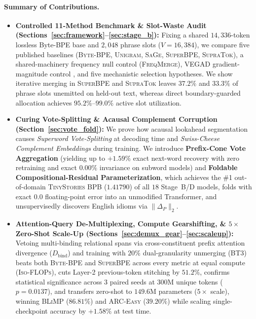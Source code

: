 \documentclass[11pt,a4paper]{article}
\begin{document}
\paragraph{Summary of Contributions.}
\begin{itemize}
    \item \textbf{Controlled 11-Method Benchmark \& Slot-Waste Audit (Sections~\ref{sec:framework}--\ref{sec:stage_b}):} Fixing a shared $14{,}336$-token lossless Byte-BPE base and $2{,}048$ phrase slots ($V=16{,}384$), we compare five published baselines (\textsc{Byte-BPE}, \textsc{Unigram}, \textsc{SaGe}, \textsc{SuperBPE}, \textsc{SupraTok}), a shared-machinery frequency null control (\textsc{FreqMerge}), \textsc{VEGAD} gradient-magnitude control \citep{liu2024gold}, and five mechanistic selection hypotheses. We show iterative merging in \textsc{SuperBPE} and \textsc{SupraTok} leaves $37.2\%$ and $33.3\%$ of phrase slots unemitted on held-out text, whereas direct boundary-guarded allocation achieves $95.2\%$--$99.0\%$ active slot utilization.
    \item \textbf{Curing Vote-Splitting \& Acausal Complement Corruption (Section~\ref{sec:vote_fold}):} We prove how acausal lookahead segmentation causes \emph{Superword Vote-Splitting} at decoding time and \emph{Swiss-Cheese Complement Embeddings} during training. We introduce \textbf{Prefix-Cone Vote Aggregation} (yielding up to $+1.59\%$ exact next-word recovery with zero retraining and exact $0.00\%$ invariance on subword models) and \textbf{Foldable Compositional-Residual Parameterization}, which achieves the \#1 out-of-domain \textsc{TinyStories} BPB ($1.41790$) of all $18$ Stage~B/D models, folds with exact $0.0$ floating-point error into an unmodified Transformer, and unsupervisedly discovers English idioms via $\|\Delta_P\|_2$.
    \item \textbf{Attention-Query De-Multiplexing, Compute Gearshifting, \& $5\times$ Zero-Shot Scale-Up (Sections~\ref{sec:demux_gear}--\ref{sec:scaleup}):} Vetoing multi-binding relational spans via cross-constituent prefix attention divergence ($D_{\text{bind}}$) and training with $20\%$ dual-granularity unmerging (\textsc{BT3}) beats both \textsc{Byte-BPE} and \textsc{SuperBPE} across every metric at equal compute (\textsc{Iso-FLOPs}), cuts Layer-2 previous-token stitching by $51.2\%$, confirms statistical significance across $3$ paired seeds at $300\text{M}$ unique tokens ($p=0.0137$), and transfers zero-shot to $149.6\text{M}$ parameters ($5\times$ scale), winning \textsc{BLiMP} ($86.81\%$) and \textsc{ARC-Easy} ($39.20\%$) while scaling single-checkpoint accuracy by $+1.58\%$ at test time.
\end{itemize}
\end{document}
